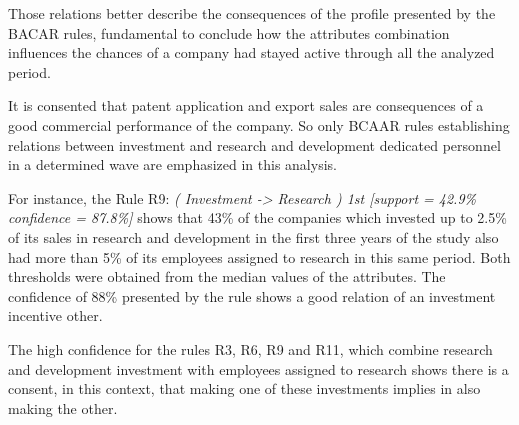 \documentclass[a4paper,twoside]{article}
\begin{document}
Those relations better describe the consequences of the profile presented by the BACAR rules, fundamental to conclude how the attributes combination influences the chances of a company had stayed active through all the analyzed period.

It is consented that patent application and export sales are consequences of a good commercial performance of the company. So only BCAAR rules establishing relations between investment and research and development dedicated personnel in a determined wave are emphasized in this analysis.

For instance, the Rule R9: \textit{( Investment -> Research ) 1st [support = 42.9\% confidence = 87.8\%]} shows that 43\% of the companies which invested up to 2.5\% of its sales in research and development in the first three years of the study also had more than 5\% of its employees assigned to research in this same period. Both thresholds were obtained from the median values of the attributes. The confidence of 88\% presented by the rule shows a good relation of an investment incentive other.

The high confidence for the rules R3, R6, R9 and R11, which combine research and development investment with employees assigned to research shows there is a consent, in this context, that making one of these investments implies in also making the other.
\end{document}
